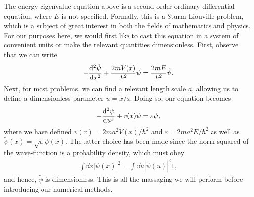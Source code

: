 The energy eigenvalue equation above is a second-order ordinary differential equation, where $E$ is not specified.
Formally, this is a Sturm-Liouville problem, which is a subject of great interest in both the fields of mathematics and physics.
For our purposes here, we would first like to cast this equation in a system of convenient units or make the relevant quantities dimensionless.
First, observe that we can write
\begin{align}
    -\dv[2]{\tilde{\psi}}{x} + \frac{2 m V(x)}{\hbar^2} \tilde{\psi} = \frac{2 m E}{\hbar^2} \tilde{\psi}
.\end{align}
Next, for most problems, we can find a relevant length scale $a$, allowing us to define a dimensionless parameter $u = x/a$.
Doing so, our equation becomes
\begin{align}
\label{eq:dimless-SE}
    -\dv[2]{\psi}{u} + v(x) \psi = \varepsilon \psi
,\end{align}
where we have defined $v(x) = 2 m a^2 V(x) / \hbar^2$ and $\varepsilon = 2 m a^2 E / \hbar^2$ as well as $\tilde{\psi}(x) = \sqrt{a} \psi(x)$.
The latter choice has been made since the norm-squared of the wave-function is a probability density, which must obey
\begin{align}
    \int \dd{x} |\psi(x)|^2 = \int \dd{u} |\tilde{\psi}(u)|^2 1
,\end{align}
and hence, $\tilde{\psi}$ is dimensionless.
This is all the massaging we will perform before introducing our numerical methods.

